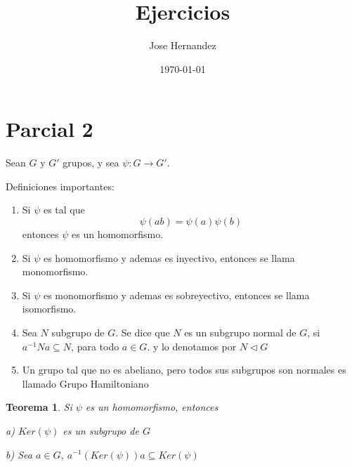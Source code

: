 \documentclass{article}
\title{Ejercicios}
\author{Jose Hernandez}
\date{\today}
\newtheorem{theorem}{Teorema}[section]
\begin{document}
\maketitle

\section{Parcial 2}

Sean \( G \) y \( G' \) grupos, y sea \( \psi  \colon G \to G' \). 

Definiciones importantes:

\begin{enumerate}
    \item Si \( \psi \) es tal que
        \[
            \psi (ab) = \psi (a) \psi (b)
        \] 
        entonces \( \psi  \) es un homomorfismo.
    \item Si \( \psi  \) es homomorfismo y ademas es inyectivo, entonces se llama monomorfismo.
    \item Si \( \psi  \) es monomorfismo y ademas es sobreyectivo, entonces se llama isomorfismo.
    \item Sea \( N \) subgrupo de \( G \). Se dice que \( N \) es un subgrupo normal de \( G \), si
        \( a^{-1}Na \subseteq N \), para todo \( a \in G \). y lo denotamos por \( N \triangleleft G \)
    \item Un grupo tal que no es abeliano, pero todos sus subgrupos son normales es llamado Grupo Hamiltoniano
\end{enumerate}


\begin{theorem}
    Si \( \psi  \) es un homomorfismo, entonces

    a) \( Ker(\psi ) \) es un subgrupo de \( G \)

    b) Sea \( a \in G \), \( a^{-1}(Ker(\psi ))a \subseteq Ker(\psi ) \)
\end{theorem}
\end{document}
